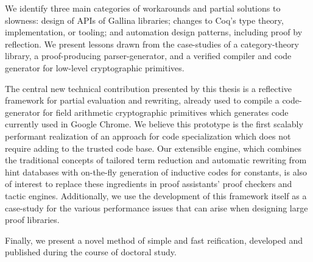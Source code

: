 We identify three main categories of workarounds and partial solutions to slowness: design of APIs of Gallina libraries; changes to Coq's type theory, implementation, or tooling; and automation design patterns, including proof by reflection.
We present lessons drawn from the case-studies of a category-theory library, a proof-producing parser-generator, and a verified compiler and code generator for low-level cryptographic primitives.

The central new technical contribution presented by this thesis is a reflective framework for partial evaluation and rewriting, already used to compile a code-generator for field arithmetic cryptographic primitives which generates code currently used in Google Chrome.
We believe this prototype is the first scalably performant realization of an approach for code specialization which does not require adding to the trusted code base.
Our extensible engine, which combines the traditional concepts of tailored term reduction and automatic rewriting from hint databases with on-the-fly generation of inductive codes for constants, is also of interest to replace these ingredients in proof assistants' proof checkers and tactic engines.
Additionally, we use the development of this framework itself as a case-study for the various performance issues that can arise when designing large proof libraries.

Finally, we present a novel method of simple and fast reification, developed and published during the course of doctoral study.
